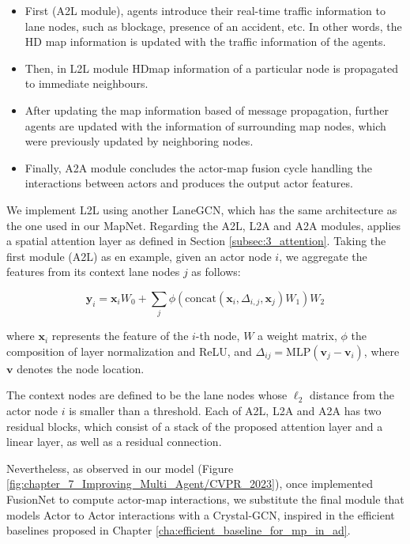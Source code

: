 \begin{itemize}
	
	\item First (A2L module), agents introduce their real-time traffic information to lane nodes, such as blockage, presence of an accident, etc. In other words, the HD map information is updated with the traffic information of the agents.
	
	\item Then, in L2L module \ac{HDmap} information of a particular node is propagated to immediate neighbours.
	
	\item After updating the map information based of message propagation, further agents are updated with the information of surrounding map nodes, which were previously updated by neighboring nodes.
	
	\item Finally, A2A module concludes the actor-map fusion cycle handling the interactions between actors and produces the output actor features.
	
\end{itemize}

We implement L2L using another LaneGCN, which has the same architecture as the one used in our MapNet. Regarding the A2L, L2A and A2A modules, \cite{liang2020learning} applies a spatial attention layer as defined in Section \ref{subsec:3_attention}. Taking the first module (A2L) as en example, given an actor node $i$, we aggregate the features from its context lane nodes $j$ as follows:

\begin{equation}
	\mathbf{y}_i = \mathbf{x}_i W_0 + \sum_j \phi ( \text{concat} (\mathbf{x}_i, \Delta_{i,j}, \mathbf{x}_j) W_1) W_2
	\label{equ:attention}
\end{equation}

where $\mathbf{x}_i$ represents the feature of the $i$-th node, $W$ a weight matrix, $\phi$ the composition of layer normalization and ReLU, and $\Delta_{ij} = \text{MLP}(\mathbf{v}_j - \mathbf{v}_i)$, where $\mathbf{v}$ denotes the node location.

The context nodes are defined to be the lane nodes whose $\ell_2$ distance from the actor node $i$ is smaller than a threshold. Each of A2L, L2A and A2A has two residual blocks, which consist of a stack of the proposed attention layer and a linear layer, as well as a residual connection. 

Nevertheless, as observed in our model (Figure \ref{fig:chapter_7_Improving_Multi_Agent/CVPR_2023}), once implemented FusionNet to compute actor-map interactions, we substitute the final module that models Actor to Actor interactions with a Crystal-\ac{GCN}, inspired in the efficient baselines proposed in Chapter \ref{cha:efficient_baseline_for_mp_in_ad}. %

